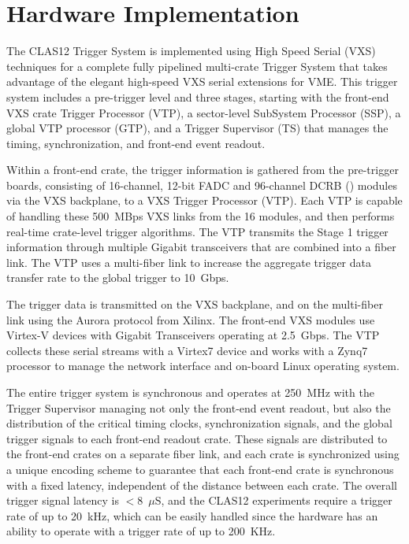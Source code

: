 \section{Hardware Implementation}

The CLAS12 Trigger System is implemented using High Speed Serial (VXS) techniques for a complete fully pipelined multi-crate Trigger System that takes advantage of the elegant high-speed VXS serial extensions for VME.  This trigger system includes a pre-trigger level and three stages, starting with the front-end VXS crate Trigger Processor (VTP), a sector-level SubSystem Processor (SSP), a global VTP processor (GTP), and a Trigger Supervisor (TS) that manages the timing, synchronization, and front-end event readout.

Within a front-end crate, the trigger information is gathered from the pre-trigger boards, consisting of 16-channel, 12-bit FADC and 96-channel DCRB (\cite{daq-ref}) modules via the VXS backplane, to a VXS Trigger Processor (VTP). Each VTP is capable of handling these 500~MBps VXS links from the 16 modules, and then performs real-time crate-level trigger algorithms.  The VTP transmits the Stage 1 trigger information through multiple Gigabit transceivers that are combined into a fiber link. The VTP uses a multi-fiber link to increase the aggregate trigger data transfer rate to the global trigger to 10~Gbps.

The trigger data is transmitted on the VXS backplane, and on the multi-fiber link using the Aurora protocol from Xilinx.  The front-end VXS modules use Virtex-V devices with Gigabit Transceivers operating at 2.5~Gbps. The VTP collects these serial streams with a Virtex7 device and works with a Zynq7 processor to manage the network interface and on-board Linux operating system.

The entire trigger system is synchronous and operates at 250~MHz with the Trigger Supervisor managing not only the front-end event readout, but also the distribution of the critical timing clocks, synchronization signals, and the global trigger signals to each front-end readout crate.  These signals are distributed to the front-end crates on a separate fiber link, and each crate is synchronized using a unique encoding scheme to guarantee that each front-end crate is synchronous with a fixed latency, independent of the distance between each crate.  The overall trigger signal latency is $<$8~$\mu$S, and the CLAS12 experiments require a trigger rate of up to 20~kHz, which can be easily handled since the hardware has an ability to operate with a trigger rate of up to 200~KHz.


